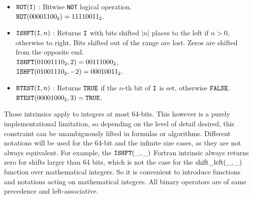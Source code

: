 \documentclass[./thesis.tex]{subfiles}
\begin{document}
\begin{sloppypar}
\begin{itemize}
	      
	\item $\text{\texttt{NOT}}({\texttt{I}})$ : Bitwise \texttt{NOT} logical operation. \\
        ${\text{\texttt{NOT}}({00001100_{\mathtt{2}}}) = {11110011_{\mathtt{2}}}}$.
	      
	\item $\text{\texttt{ISHFT}}({\texttt{I}},n)$ : Returns ${\texttt{I}}$ with bits shifted $|n|$ places to the left if $n>0$, otherwise to right. Bits shifted out of the range are lost. Zeros are shifted from the opposite end. \\
        ${\text{\texttt{ISHFT}}({01001110_{\mathtt{2}}},2) = {00111000_{\mathtt{2}}}}$, \\
        ${\text{\texttt{ISHFT}}({01001110_{\mathtt{2}}},-2) = {00010011_{\mathtt{2}}}}$.
	      
	\item $\text{\texttt{BTEST}}({\texttt{I}},n)$ : Returns ${\text{\texttt{TRUE}}}$ if the $n$-th bit of ${\texttt{I}}$ is set, otherwise ${\text{\texttt{FALSE}}}$. \\
        $\text{\texttt{BTEST}}({00001000_{\mathtt{2}}},3) = {\text{\texttt{TRUE}}}$.
	      
\end{itemize}
\end{sloppypar}
      
      
Those intrinsics apply to integers at most 64-bits. This however is a purely implementational limitation, so depending on the level of detail desired, this constraint can be unambiguously lifted in formulas or algorithms. Different notations will be used for the 64-bit and the infinite size cases, as they are not always equivalent.
For example, the $\text{\texttt{ISHFT}}(\_,\_)$ Fortran intrinsic always returns zero for shifts larger than 64 bits, which is not the case for the $\text{shift\_left}(\_,\_)$ function over mathematical integers.
So it is convenient to introduce functions and notations acting on mathematical integers. All binary operators are of same precedence and left-associative.
\end{document}
